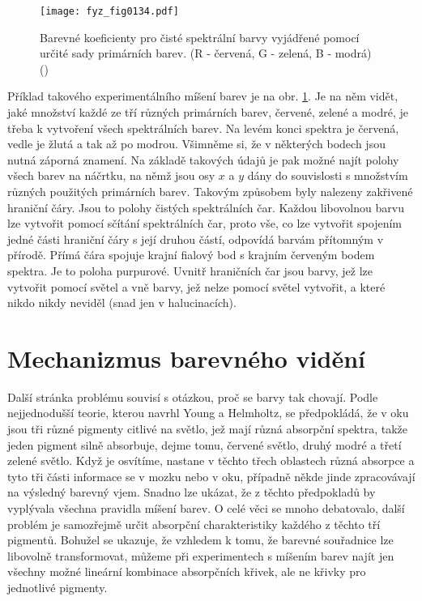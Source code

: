     \begin{figure}[ht!]  %
      \centering
      \texttt{[image: fyz\_fig0134.pdf]}
      \caption{Barevné koeficienty pro čisté spektrální barvy vyjádřené pomocí určité sady
               primárních barev. (R - červená, G - zelená, B - modrá)
              (\cite[s.~475]{Feynman01})}
      \label{fyz:fig0134}
    \end{figure}
    Příklad takového experimentálního míšení barev je na obr. \ref{fyz:fig0134}. Je na něm vidět, 
    jaké množství každé ze tří různých primárních barev, červené, zelené a modré, je třeba k 
    vytvoření všech spektrálních barev. Na levém konci spektra je červená, vedle je žlutá a tak až 
    po modrou. Všimněme si, že v některých bodech jsou nutná záporná znamení. Na základě takových 
    údajů je pak možné najít polohy všech barev na náčrtku, na němž jsou osy \(x\) a \(y\) dány do 
    souvislosti s množstvím různých použitých primárních barev. Takovým způsobem byly nalezeny 
    zakřivené hraniční čáry. Jsou to polohy čistých spektrálních čar. Každou libovolnou barvu lze 
    vytvořit pomocí sčítání spektrálních čar, proto vše, co lze vytvořit spojením jedné části 
    hraniční čáry s její druhou částí, odpovídá barvám přítomným v přírodě. Přímá čára spojuje 
    krajní fialový bod s krajním červeným bodem spektra. Je to poloha purpurové. Uvnitř hraničních 
    čar jsou barvy, jež lze vytvořit pomocí světel a vně barvy, jež nelze pomocí světel vytvořit, a 
    které nikdo nikdy neviděl (snad jen v halucinacích).
    
  \section{Mechanizmus barevného vidění}\label{fyz:IchapXXXVsecV}

    Další stránka problému souvisí s otázkou, proč se barvy tak chovají. Podle nejjednodušší 
    teorie, kterou navrhl Young a Helmholtz, se předpokládá, že v oku jsou tři různé pigmenty 
    citlivé na světlo, jež mají různá absorpční spektra, takže jeden pigment silně absorbuje, dejme 
    tomu, červené světlo, druhý modré a třetí zelené světlo. Když je osvítíme, nastane v těchto 
    třech oblastech různá absorpce a tyto tři části informace se v mozku nebo v oku, případně někde 
    jinde zpracovávají na výsledný barevný vjem. Snadno lze ukázat, že z těchto předpokladů by 
    vyplývala všechna pravidla míšení barev. O celé věci se mnoho debatovalo, další problém je 
    samozřejmě určit absorpční charakteristiky každého z těchto tří pigmentů. Bohužel se ukazuje, 
    že vzhledem k tomu, že barevné souřadnice lze libovolně transformovat, můžeme při experimentech 
    s míšením barev najít jen všechny možné lineární kombinace absorpčních křivek, ale ne křivky 
    pro jednotlivé pigmenty. 
    
